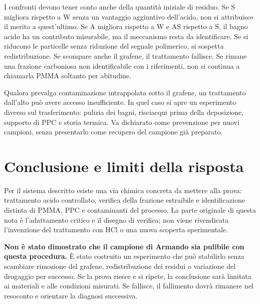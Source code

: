 \documentclass[11pt,reqno]{amsart}
\numberwithin{equation}{section}
\begin{document}
I confronti devono tener conto anche della quantit\`a iniziale di residuo.
Se S migliora rispetto a W senza un vantaggio aggiuntivo dell'acido,
non si attribuisce il merito a quest'ultimo. Se A migliora rispetto a W
e AS rispetto a S, il bagno acido ha un contributo misurabile,
ma il meccanismo resta da identificare. Se si riducono
le particelle senza riduzione del segnale polimerico, si sospetta
redistribuzione. Se scompare anche il grafene, il trattamento fallisce.
Se rimane una frazione carboniosa non identificabile con i riferimenti,
non si continua a chiamarla PMMA soltanto per abitudine.

Qualora prevalga contaminazione intrappolata sotto il grafene,
un trattamento dall'alto pu\`o avere accesso insufficiente. In quel
caso si apre un esperimento diverso sul trasferimento: pulizia dei
bagni, risciacqui prima della deposizione, supporto di PPC e storia
termica. Va dichiarato come prevenzione per nuovi campioni, senza
presentarlo come recupero del campione gi\`a preparato.

\section{Conclusione e limiti della risposta}

Per il sistema descritto esiste una via chimica concreta da mettere
alla prova: trattamento acido controllato, verifica della frazione
estraibile e identificazione distinta di PMMA, PPC e contaminanti
del processo. La parte originale di questa nota \`e l'adattamento
critico e il disegno di verifica; non viene rivendicata l'invenzione
del trattamento con HCl o una nuova scoperta sperimentale.

\textbf{Non \`e stato dimostrato che il campione di Armando sia pulibile
con questa procedura.} \`E stato costruito un esperimento che pu\`o
stabilirlo senza scambiare rimozione del grafene, redistribuzione
dei residui o variazione del drogaggio per successo. Se la prova
riesce e si ripete, la conclusione sar\`a limitata ai materiali e alle
condizioni misurati. Se fallisce, il fallimento dovr\`a rimanere nel
resoconto e orientare la diagnosi successiva.
\end{document}
